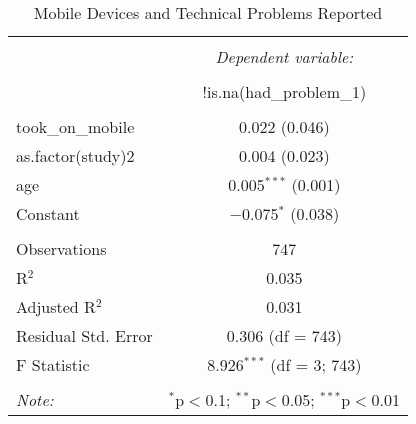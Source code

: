 
\begin{table}[H] \centering 
  \caption{Mobile Devices and Technical Problems Reported} 
  \label{tab:s12_mobile_tech} 
\begin{tabular}{@{\extracolsep{5pt}}lc} 
\\[-1.8ex]\hline 
\hline \\[-1.8ex] 
 & \multicolumn{1}{c}{\textit{Dependent variable:}} \\ 
\cline{2-2} 
\\[-1.8ex] & !is.na(had\_problem\_1) \\ 
\hline \\[-1.8ex] 
 took\_on\_mobile & 0.022 (0.046) \\ 
  as.factor(study)2 & 0.004 (0.023) \\ 
  age & 0.005$^{***}$ (0.001) \\ 
  Constant & $-$0.075$^{*}$ (0.038) \\ 
 \hline \\[-1.8ex] 
Observations & 747 \\ 
R$^{2}$ & 0.035 \\ 
Adjusted R$^{2}$ & 0.031 \\ 
Residual Std. Error & 0.306 (df = 743) \\ 
F Statistic & 8.926$^{***}$ (df = 3; 743) \\ 
\hline 
\hline \\[-1.8ex] 
\textit{Note:}  & \multicolumn{1}{r}{$^{*}$p$<$0.1; $^{**}$p$<$0.05; $^{***}$p$<$0.01} \\ 
\end{tabular} 
\end{table} 
